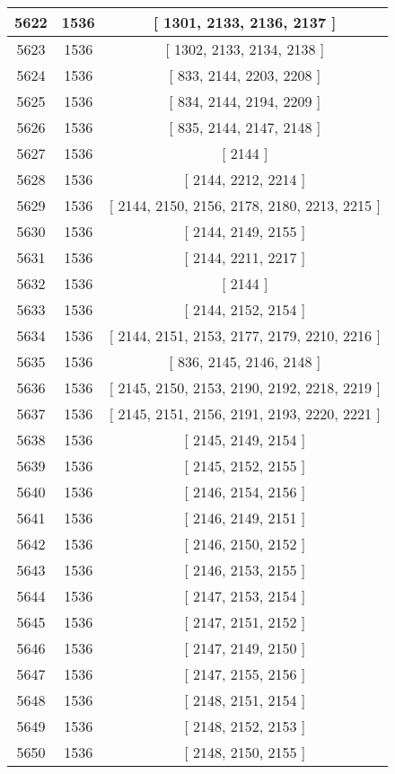 \begin{center}
\begin{longtable}[H]{|| c c c ||}
\hline
5622 & 1536 & [ 1301, 2133, 2136, 2137 ] \\ 
\hline
5623 & 1536 & [ 1302, 2133, 2134, 2138 ] \\ 
\hline
5624 & 1536 & [ 833, 2144, 2203, 2208 ] \\ 
\hline
5625 & 1536 & [ 834, 2144, 2194, 2209 ] \\ 
\hline
5626 & 1536 & [ 835, 2144, 2147, 2148 ] \\ 
\hline
5627 & 1536 & [ 2144 ] \\ 
\hline
5628 & 1536 & [ 2144, 2212, 2214 ] \\ 
\hline
5629 & 1536 & [ 2144, 2150, 2156, 2178, 2180, 2213, 2215 ] \\ 
\hline
5630 & 1536 & [ 2144, 2149, 2155 ] \\ 
\hline
5631 & 1536 & [ 2144, 2211, 2217 ] \\ 
\hline
5632 & 1536 & [ 2144 ] \\ 
\hline
5633 & 1536 & [ 2144, 2152, 2154 ] \\ 
\hline
5634 & 1536 & [ 2144, 2151, 2153, 2177, 2179, 2210, 2216 ] \\ 
\hline
5635 & 1536 & [ 836, 2145, 2146, 2148 ] \\ 
\hline
5636 & 1536 & [ 2145, 2150, 2153, 2190, 2192, 2218, 2219 ] \\ 
\hline
5637 & 1536 & [ 2145, 2151, 2156, 2191, 2193, 2220, 2221 ] \\ 
\hline
5638 & 1536 & [ 2145, 2149, 2154 ] \\ 
\hline
5639 & 1536 & [ 2145, 2152, 2155 ] \\ 
\hline
5640 & 1536 & [ 2146, 2154, 2156 ] \\ 
\hline
5641 & 1536 & [ 2146, 2149, 2151 ] \\ 
\hline
5642 & 1536 & [ 2146, 2150, 2152 ] \\ 
\hline
5643 & 1536 & [ 2146, 2153, 2155 ] \\ 
\hline
5644 & 1536 & [ 2147, 2153, 2154 ] \\ 
\hline
5645 & 1536 & [ 2147, 2151, 2152 ] \\ 
\hline
5646 & 1536 & [ 2147, 2149, 2150 ] \\ 
\hline
5647 & 1536 & [ 2147, 2155, 2156 ] \\ 
\hline
5648 & 1536 & [ 2148, 2151, 2154 ] \\ 
\hline
5649 & 1536 & [ 2148, 2152, 2153 ] \\ 
\hline
5650 & 1536 & [ 2148, 2150, 2155 ] \\ 
\hline

\end{longtable}
\end{center}
